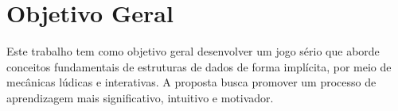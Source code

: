 \section{Objetivo Geral}

Este trabalho tem como objetivo geral desenvolver um jogo sério que aborde
conceitos fundamentais de estruturas de dados de forma implícita, por meio de
mecânicas lúdicas e interativas. A proposta busca promover um processo de
aprendizagem mais significativo, intuitivo e motivador.
